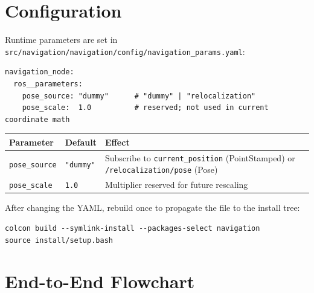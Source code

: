 \documentclass[12pt,a4paper]{article}
\begin{document}
\section{Configuration}

Runtime parameters are set in
\texttt{src/navigation/navigation/config/navigation\_params.yaml}:

\begin{lstlisting}[style=yaml, caption={navigation\_params.yaml}]
navigation_node:
  ros__parameters:
    pose_source: "dummy"      # "dummy" | "relocalization"
    pose_scale:  1.0          # reserved; not used in current coordinate math
\end{lstlisting}

\begin{center}
\begin{tabular}{lll}
\toprule
\textbf{Parameter} & \textbf{Default} & \textbf{Effect} \\
\midrule
\texttt{pose\_source} & \texttt{"dummy"} &
  Subscribe to \texttt{current\_position} (PointStamped) or
  \texttt{/relocalization/pose} (Pose) \\
\texttt{pose\_scale}  & \texttt{1.0} & Multiplier reserved for future rescaling \\
\bottomrule
\end{tabular}
\end{center}

After changing the YAML, rebuild once to propagate the file to the install tree:

\begin{lstlisting}[style=yaml]
colcon build --symlink-install --packages-select navigation
source install/setup.bash
\end{lstlisting}

\section{End-to-End Flowchart}
\end{document}
